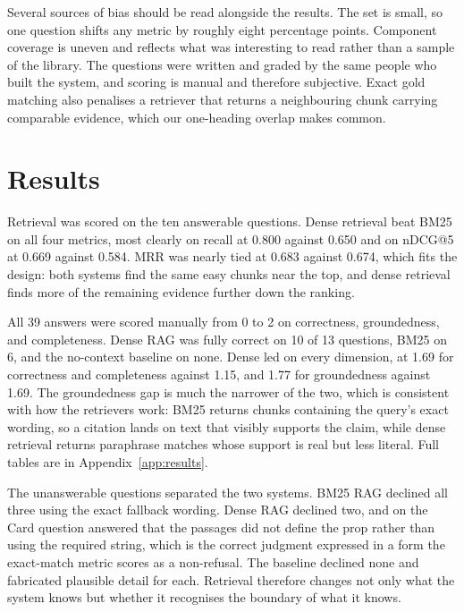 \documentclass[10pt,a4paper]{article}
\begin{document}
Several sources of bias should be read alongside the results. The set is small, so one question shifts any metric by roughly eight percentage points. Component coverage is uneven and reflects what was interesting to read rather than a sample of the library. The questions were written and graded by the same people who built the system, and scoring is manual and therefore subjective. Exact gold matching also penalises a retriever that returns a neighbouring chunk carrying comparable evidence, which our one-heading overlap makes common.

\section{Results}

Retrieval was scored on the ten answerable questions. Dense retrieval beat BM25 on all four metrics, most clearly on recall at 0.800 against 0.650 and on nDCG@5 at 0.669 against 0.584. MRR was nearly tied at 0.683 against 0.674, which fits the design: both systems find the same easy chunks near the top, and dense retrieval finds more of the remaining evidence further down the ranking.

All 39 answers were scored manually from 0 to 2 on correctness, groundedness, and completeness. Dense RAG was fully correct on 10 of 13 questions, BM25 on 6, and the no-context baseline on none. Dense led on every dimension, at 1.69 for correctness and completeness against 1.15, and 1.77 for groundedness against 1.69. The groundedness gap is much the narrower of the two, which is consistent with how the retrievers work: BM25 returns chunks containing the query's exact wording, so a citation lands on text that visibly supports the claim, while dense retrieval returns paraphrase matches whose support is real but less literal. Full tables are in Appendix~\ref{app:results}.

The unanswerable questions separated the two systems. BM25 RAG declined all three using the exact fallback wording. Dense RAG declined two, and on the Card question answered that the passages did not define the prop rather than using the required string, which is the correct judgment expressed in a form the exact-match metric scores as a non-refusal. The baseline declined none and fabricated plausible detail for each. Retrieval therefore changes not only what the system knows but whether it recognises the boundary of what it knows.
\end{document}
